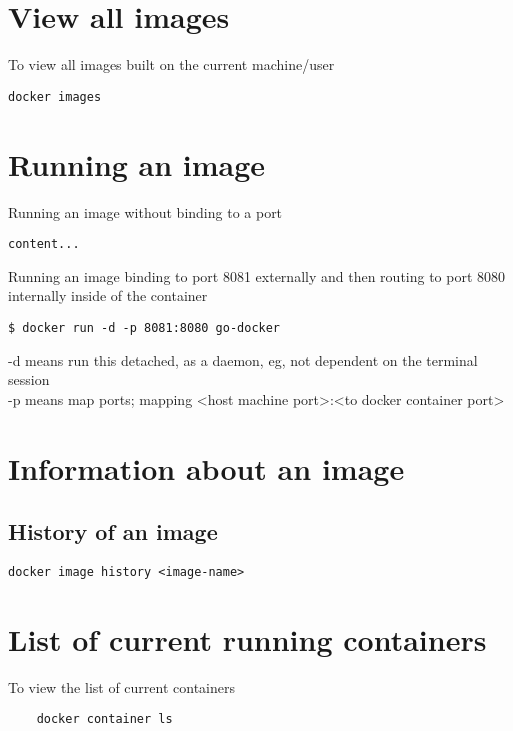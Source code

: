 \documentclass[]{article}
\newcommand{\<}{\guilsinglleft}
\renewcommand{\>}{\guilsinglright}
\begin{document}
\section{View all images}
To view all images built on the current machine/user
\begin{lstlisting}
docker images
\end{lstlisting}

\section{Running an image}

Running an image without binding to a port
\begin{lstlisting}
content...
\end{lstlisting}

Running an image binding to port 8081 externally and then routing to port 8080 internally inside of the container
\begin{lstlisting}
$ docker run -d -p 8081:8080 go-docker
\end{lstlisting}
-d means run this detached, as a daemon, eg, not dependent on the terminal session \\
-p means map ports; mapping <host machine port>:<to docker container port>

\section{Information about an image}
\subsection{History of an image}
\begin{lstlisting}
docker image history <image-name>
\end{lstlisting}

\section{List of current running containers}
\label{section:current-containers}
To view the list of current containers
\begin{lstlisting}
	docker container ls
\end{lstlisting}
\end{document}
